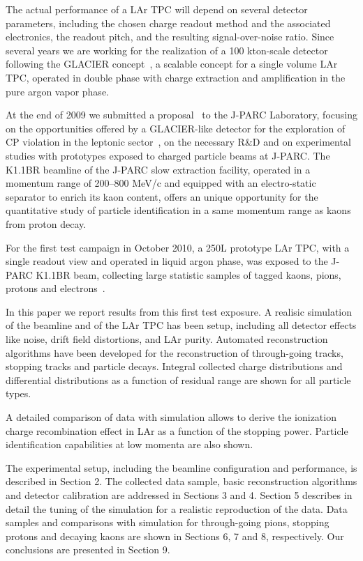 The actual performance of a LAr TPC will depend on several detector parameters, including the chosen charge readout method and the associated electronics, the readout pitch, and the resulting signal-over-noise ratio. Since several years we are working for the realization of a 100 kton-scale detector following the GLACIER concept~\cite{Rubbia:2009md}, a scalable concept for a single volume LAr TPC, operated in double phase with charge extraction and amplification in the pure argon vapor phase. 

At the end of 2009 we submitted a proposal~\cite{P32:2009} to the J-PARC Laboratory, focusing on the opportunities offered by a GLACIER-like detector for the exploration of CP violation in the leptonic sector~\cite{Badertscher:2008bp}, on the necessary R\&D and on experimental studies with prototypes exposed to charged particle beams at J-PARC. The K1.1BR beamline of the J-PARC slow extraction facility, operated in a momentum range of 200--800 MeV/c and equipped with an electro-static
separator to enrich its kaon content, offers an unique opportunity for the quantitative study of particle identification in a same momentum range as kaons from proton decay.

For the first test campaign in October 2010, a 250L prototype LAr TPC, with a single readout view and operated in liquid argon phase, was exposed to the J-PARC K1.1BR beam, collecting large statistic samples of tagged kaons, pions, protons and electrons~\cite{Araoka:2011pw}.

In this paper we report results from this first test exposure. A realisic simulation of the beamline and of the LAr TPC has been setup, including all detector effects like noise, drift field distortions, and LAr purity. Automated reconstruction algorithms have been developed for the reconstruction of through-going tracks, stopping tracks and particle decays. Integral collected charge distributions and differential distributions as a function of residual range are shown for all particle types. 

A detailed comparison of data with simulation allows to derive the ionization charge recombination effect in LAr as a function of the stopping power. Particle identification capabilities at low momenta are also shown. 

The experimental setup, including the beamline configuration and performance, is described in Section 2. The collected data sample, basic reconstruction algorithms and detector calibration are addressed in Sections 3 and 4. Section 5 describes in detail the tuning of the simulation for a realistic reproduction of the data. Data samples and comparisons with simulation for through-going pions, stopping protons and decaying kaons are shown in Sections 6, 7 and 8, respectively. Our conclusions are presented in Section 9.

